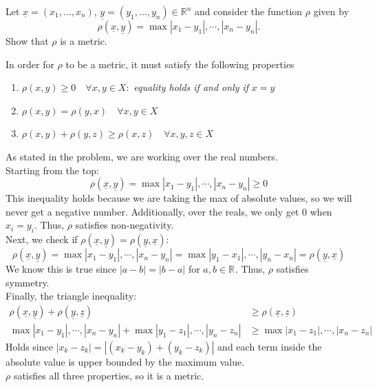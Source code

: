 \documentclass[11pt]{article}
\providecommand{\R}[1][]{\ensuremath{\mathbb{R}^{#1}}}
\begin{document}
\begin{homeworkProblem}
    Let $\underline{x}=\left(x_1, \ldots, x_n\right)$,  $\underline{y}=\left(y_1, \ldots, y_n\right) \in \mathbb{R}^n$ and
    consider the function $\rho$ given by
    \[
        \rho(\underline{x}, \underline{y}) = \max{|x_1 - y_1|, \cdots, |x_n - y_n|}.
    \]
    Show that $\rho$ is a metric. \vspace{1\baselineskip}

    \solution

    In order for $\rho$ to be a metric, it must satisfy the following properties
    \begin{enumerate}[topsep=5pt, itemsep=2.5pt, ]
        \item $\rho(x, y) \geq 0 \quad \forall x, y \in X :$ \textit{equality holds if and only if} $x = y$
        \item $\rho(x, y) = \rho(y, x) \quad \forall x, y \in X$
        \item $\rho(x, y) + \rho(y, z) \geq \rho(x, z) \quad \forall x, y, z \in X$
    \end{enumerate}
    As stated in the problem, we are working over the real numbers. \\

    Starting from the top:
    \[
        \rho(\underline{x}, \underline{y}) = \max{|x_1 - y_1|, \cdots, |x_n - y_n|} \geq 0
    \]
    This inequality holds because we are taking the max of absolute values, so we will never get a negative number. Additionally, over the reals, we only
    get 0 when $x_i = y_i$. Thus, $\rho$ satisfies non-negativity. \\

    Next, we check if $\rho(\underline{x}, \underline{y}) = \rho(\underline{y}, \underline{x})$:
    \[
        \rho(\underline{x}, \underline{y}) = \max{|x_1 - y_1|, \cdots, |x_n - y_n|} = \max{|y_1 - x_1|, \cdots, |y_n - x_n|} = \rho(\underline{y}, \underline{x})
    \]
    We know this is true since $|a - b| = |b - a|$ for $a, b \in \R$. Thus, $\rho$ satisfies symmetry. \\

    Finally, the triangle inequality:
    \begin{align*}
        \rho(\underline{x}, \underline{y}) + \rho(\underline{y}, \underline{z})         & \geq \rho(\underline{x}, \underline{z})     \\
        \max{|x_1 - y_1|, \cdots, |x_n - y_n|} + \max{|y_1 - z_1|, \cdots, |y_n - z_n|} & \geq \max{|x_1 - z_1|, \cdots, |x_n - z_n|}
    \end{align*}
    Holds since $|x_k - z_k| = |(x_k - y_k) + (y_k - z_k)|$ and each term inside the absolute value is upper bounded by the maximum value. \\

    $\rho$ satisfies all three properties, so it is a metric.
\end{homeworkProblem}
\end{document}
